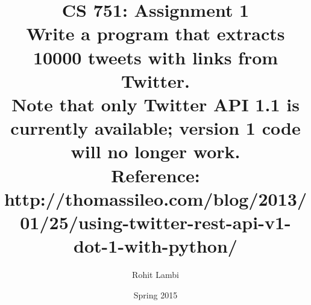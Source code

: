 \documentclass[letterpaper]{report}
\begin{document}
\renewcommand{\thesection}{\arabic{section}}


\newcommand{\hmwkTitle}{Assignment\ \1}
\newcommand{\assignmentDescription}{Write a program that extracts 10000 tweets with links from Twitter. \\
Note that only Twitter API 1.1 is currently available; version 1 code will no longer work. \\
Reference: http://thomassileo.com/blog/2013/01/25/using-twitter-rest-api-v1-dot-1-with-python/
}
\newcommand{\hmwkDueDate}{Saturday,\ February\ 14,\ 2014} 
\newcommand{\hmwkClass}{CS\ 751} 
\newcommand{\hmwkAuthorName}{Rohit Lambi <rlambi>}


\author{Rohit Lambi}
\title{CS 751: Assignment 1 \\
\normalsize\vspace{0.1in}\large{\assignmentDescription}
}

\date{Spring 2015}

\maketitle

\tableofcontents
\newpage








\nocite{*}
\end{document}
